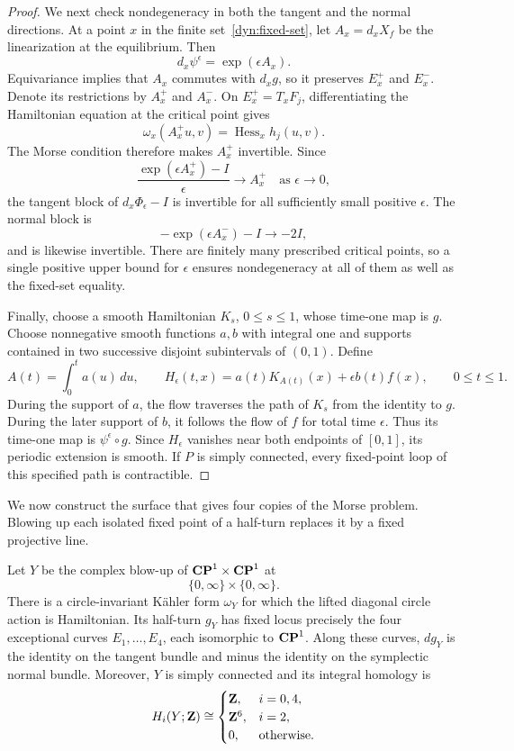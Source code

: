 \begin{proof}
We next check nondegeneracy in both the tangent and the normal
directions.  At a point $x$ in the finite set~\eqref{dyn:fixed-set},
let $A_x=d_xX_f$ be the linearization at the equilibrium.  Then
\[
  d_x\psi^\epsilon=\exp(\epsilon A_x).
\]
Equivariance implies that $A_x$ commutes with $d_xg$, so it preserves
$E_x^+$ and $E_x^-$.  Denote its restrictions by $A_x^+$ and $A_x^-$.
On $E_x^+=T_xF_j$, differentiating the Hamiltonian equation at the
critical point gives
\[
  \omega_x(A_x^+u,v)=\operatorname{Hess}_x h_j(u,v).
\]
The Morse condition therefore makes $A_x^+$ invertible.  Since
\[
  \frac{\exp(\epsilon A_x^+)-I}{\epsilon}
       \longrightarrow A_x^+
       \quad\text{as }\epsilon\longrightarrow0,
\]
the tangent block of $d_x\Phi_\epsilon-I$ is invertible for all
sufficiently small positive $\epsilon$.  The normal block is
\[
  -\exp(\epsilon A_x^-)-I\longrightarrow-2I,
\]
and is likewise invertible.  There are finitely many prescribed
critical points, so a single positive upper bound for $\epsilon$
ensures nondegeneracy at all of them as well as the fixed-set equality.

Finally, choose a smooth Hamiltonian $K_s$, $0\leq s\leq1$, whose
time-one map is $g$.  Choose nonnegative smooth functions $a,b$ with
integral one and supports contained in two successive disjoint
subintervals of $(0,1)$.  Define
\[
  A(t)=\int_0^t a(u)\,du,\qquad
  H_\epsilon(t,x)=a(t)K_{A(t)}(x)+\epsilon b(t)f(x),
  \qquad 0\leq t\leq1.
\]
During the support of $a$, the flow traverses the path of $K_s$ from
the identity to $g$.  During the later support of $b$, it follows
the flow of $f$ for total time $\epsilon$.  Thus its time-one map
is $\psi^\epsilon\circ g$.  Since $H_\epsilon$ vanishes near both
endpoints of $[0,1]$, its periodic extension is smooth.  If $P$ is
simply connected, every fixed-point loop of this specified path is
contractible.
\end{proof}

We now construct the surface that gives four copies of the Morse
problem.  Blowing up each isolated fixed point of a half-turn
replaces it by a fixed projective line.

\begin{proposition}
\label{dyn:surface}
Let $Y$ be the complex blow-up of $\mathbf{CP}^1\times\mathbf{CP}^1$ at
\[
  \{0,\infty\}\times\{0,\infty\}.
\]
There is a circle-invariant K\"ahler form $\omega_Y$ for which the
lifted diagonal circle action is Hamiltonian.  Its half-turn $g_Y$
has fixed locus precisely the four exceptional curves
$E_1,\ldots,E_4$, each isomorphic to $\mathbf{CP}^1$.  Along these curves,
$d g_Y$ is the identity on the tangent bundle and minus the identity
on the symplectic normal bundle.  Moreover, $Y$ is simply connected
and its integral homology is
\begin{equation}
\label{dyn:Y-homology}
  H_i(Y;\mathbf Z)\cong
  \begin{cases}
    \mathbf Z,&i=0,4,\\
    \mathbf Z^6,&i=2,\\
    0,&\text{otherwise}.
  \end{cases}
\end{equation}
\end{proposition}


